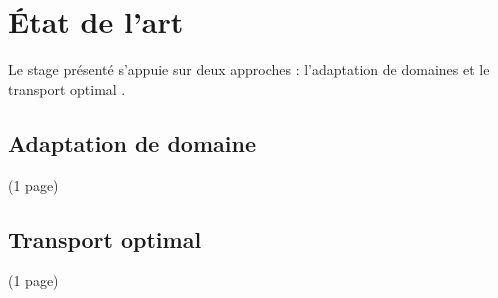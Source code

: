 \chapter{État de l'art}
\label{chap:SOA}

Le stage présenté s'appuie sur deux approches : l'adaptation de domaines \cite{Ganin2016} \cite{Ben-David2010} \cite{Laviolette} et le transport optimal \cite{Courty2015}.

\section{Adaptation de domaine}

\TODO (1 page)

\section{Transport optimal}

\TODO (1 page)
